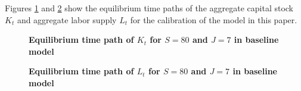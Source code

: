 \documentclass[letterpaper,12pt]{article}
\theoremstyle{definition}
\begin{document}
  Figures \ref{FigKpathTPI} and \ref{FigLpathTPI} show the equilibrium time paths of the aggregate capital stock $K_t$ and aggregate labor supply $L_t$ for the calibration of the model in this paper.

  \begin{figure}[htb]\centering \captionsetup{width=4.0in}
    \caption{\label{FigKpathTPI}\textbf{Equilibrium time path of $K_t$ for $S=80$ and $J=7$ in baseline model}}
  \end{figure}

  \begin{figure}[htb]\centering \captionsetup{width=4.0in}
    \caption{\label{FigLpathTPI}\textbf{Equilibrium time path of $L_t$ for $S=80$ and $J=7$ in baseline model}}
  \end{figure}

  \clearpage
\end{document}
